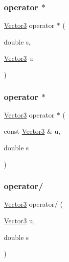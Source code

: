 \mbox{\label{class_vector3_acfbed74a82515171cc077011a2512bbe}} 
\subsubsection{\texorpdfstring{operator $\ast$}{operator *}\hspace{0.1cm}{\footnotesize\ttfamily [1/2]}}
{\footnotesize\ttfamily \mbox{\hyperlink{class_vector3}{Vector3}} operator $\ast$ (\begin{DoxyParamCaption}\item[{double}]{s,  }\item[{\mbox{\hyperlink{class_vector3}{Vector3}}}]{u }\end{DoxyParamCaption})\hspace{0.3cm}{\ttfamily [friend]}}

\mbox{\label{class_vector3_a5b45d6f5e835014c7e2636791bf18da2}} 
\subsubsection{\texorpdfstring{operator $\ast$}{operator *}\hspace{0.1cm}{\footnotesize\ttfamily [2/2]}}
{\footnotesize\ttfamily \mbox{\hyperlink{class_vector3}{Vector3}} operator $\ast$ (\begin{DoxyParamCaption}\item[{const \mbox{\hyperlink{class_vector3}{Vector3}} \&}]{u,  }\item[{double}]{s }\end{DoxyParamCaption})\hspace{0.3cm}{\ttfamily [friend]}}

\mbox{\label{class_vector3_a9059e0264f23e1c78d195b095559cb79}} 
\subsubsection{\texorpdfstring{operator/}{operator/}\hspace{0.1cm}{\footnotesize\ttfamily [1/2]}}
{\footnotesize\ttfamily \mbox{\hyperlink{class_vector3}{Vector3}} operator/ (\begin{DoxyParamCaption}\item[{\mbox{\hyperlink{class_vector3}{Vector3}}}]{u,  }\item[{double}]{s }\end{DoxyParamCaption})\hspace{0.3cm}{\ttfamily [friend]}}

